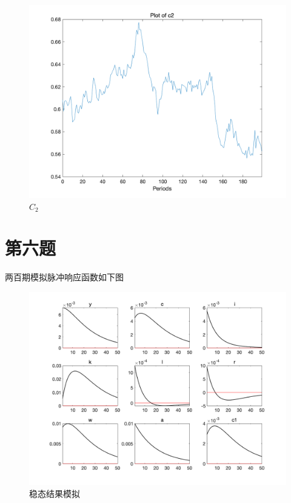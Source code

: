 \documentclass[a4paper,12pt]{ctexart}
\begin{document}
\begin{figure}[H]
    \begin{minipage}{0.48\linewidth}
        \includegraphics[width=\linewidth]{img/figure7.png}
        \caption{$C_2$}
    \end{minipage}
\end{figure}
\section*{第六题}
两百期模拟脉冲响应函数如下图
\begin{figure}[H]
    \includegraphics[width=\linewidth]{img/figure1.png}
    \caption{稳态结果模拟}
\end{figure}
\end{document}

